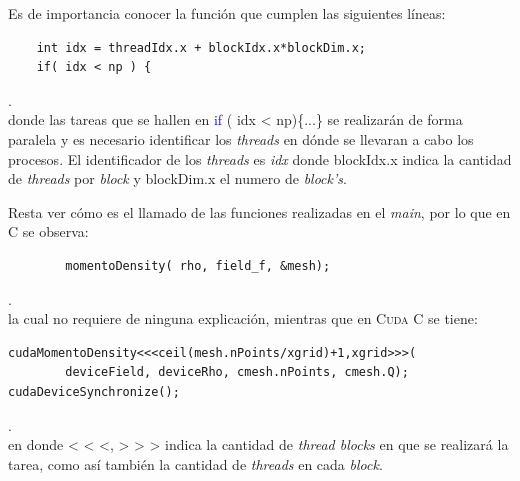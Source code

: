 Es de importancia conocer la función que cumplen las siguientes líneas:
{\footnotesize
	\begin{frame}{}
		\begin{lstlisting}
	int idx = threadIdx.x + blockIdx.x*blockDim.x;	
	if( idx < np ) {	
		\end{lstlisting}
		
	\end{frame}
}.
\\
donde las tareas que se hallen en \textcolor{blue}{if} ( idx < np)\{...\} se realizarán de forma paralela y es necesario identificar los \textit{threads} en dónde se llevaran a cabo los procesos. El identificador de los \textit{threads} es \textit{idx} donde blockIdx.x  indica la cantidad de \textit{threads} por \textit{block} y blockDim.x el numero de \textit{block's}.

Resta ver cómo es el llamado de las funciones realizadas en el \textit{main}, por lo que en \textsc{C} se observa:


{\footnotesize
	\begin{frame}{}
		\begin{lstlisting}
		momentoDensity( rho, field_f, &mesh);
		\end{lstlisting}
		
	\end{frame}
}.
\\
la cual no requiere de ninguna explicación, mientras que en \textsc{Cuda C} se tiene:

{\footnotesize
	\begin{frame}{}
		\begin{lstlisting}
cudaMomentoDensity<<<ceil(mesh.nPoints/xgrid)+1,xgrid>>>(
 		deviceField, deviceRho, cmesh.nPoints, cmesh.Q);  
cudaDeviceSynchronize();

		\end{lstlisting}
		
	\end{frame}
}.
\\
en donde < < <, > > > indica la cantidad de \textit{thread blocks} en que se realizará la tarea, como así también la cantidad de \textit{threads} en cada \textit{block}.

